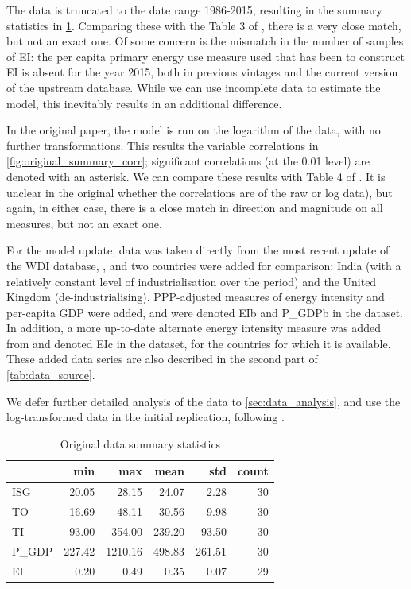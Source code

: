 \documentclass[11pt,a4paper]{article}
\begin{document}
The data is truncated to the date range 1986-2015, resulting in the summary statistics in \cref{tab:original_summary_stats}.
Comparing these with the Table 3 of \cite{panHowIndustrializationTrade2019}, there is a very close match, but not an exact one.
Of some concern is the mismatch in the number of samples of EI: the per capita primary energy use measure used that has been to construct EI is absent for the year 2015, both in previous vintages and the current version of the upstream database.
While we can use incomplete data to estimate the model, this inevitably results in an additional difference.

In the original paper, the model is run on the logarithm of the data, with no further transformations. 
This results the variable correlations in \cref{fig:original_summary_corr}; significant correlations (at the 0.01 level) are denoted with an asterisk.
We can compare these results with Table 4 of \cite{panHowIndustrializationTrade2019}. 
It is unclear in the original whether the correlations are of the raw or log data), but again, in either case, there is a close match in direction and magnitude on all measures, but not an exact one.

For the model update, data was taken directly from the most recent update of the WDI database, \cite{theworldbankWorldDevelopmentIndicators2019}, and two countries were added for comparison: India (with a relatively constant level of industrialisation over the period) and the United Kingdom (de-industrialising). 
PPP-adjusted measures of energy intensity and per-capita GDP were added, and were denoted EIb and P\_GDPb in the dataset. 
In addition, a more up-to-date alternate energy intensity measure was added from \cite{enerdataGlobalEnergyStatistical2019} and denoted EIc in the dataset, for the countries for which it is available.
These added data series are also described in the second part of \cref{tab:data_source}.

We defer further detailed analysis of the data to \cref{sec:data_analysis}, and use the log-transformed data in the initial replication, following \cite{panHowIndustrializationTrade2019}.

\begin{table}[tbp]
\centering
\begin{tabular}{lrrrrr}
\toprule
{} &    min &     max &   mean &    std &  count \\
\midrule
ISG   &  20.05 &   28.15 &  24.07 &   2.28 &     30 \\
TO    &  16.69 &   48.11 &  30.56 &   9.98 &     30 \\
TI    &  93.00 &  354.00 & 239.20 &  93.50 &     30 \\
P\_GDP & 227.42 & 1210.16 & 498.83 & 261.51 &     30 \\
EI    &   0.20 &    0.49 &   0.35 &   0.07 &     29 \\
\bottomrule
\end{tabular}
\caption{Original data summary statistics}
\label{tab:original_summary_stats}
\end{table}
\end{document}
